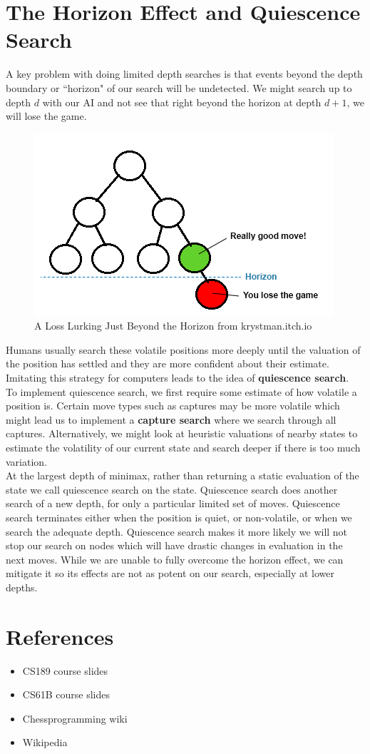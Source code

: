 \documentclass[12pt, letterpaper]{article}
\begin{document}
\section*{The Horizon Effect and Quiescence Search}
A key problem with doing limited depth searches is that events beyond the depth boundary or ``horizon" of our search will be undetected. We might search up to depth $d$ with our AI and not see that right beyond the horizon at depth $d + 1$, we will lose the game. \\
\begin{figure}[H]
    \centering
    \includegraphics[]{horizon.png}
    \caption*{A Loss Lurking Just Beyond the Horizon from krystman.itch.io}
\end{figure}
Humans usually search these volatile positions more deeply until the valuation of the position has settled and they are more confident about their estimate. Imitating this strategy for computers leads to the idea of \textbf{quiescence search}. \\
To implement quiescence search, we first require some estimate of how volatile a position is. Certain move types such as captures may be more volatile which might lead us to implement a \textbf{capture search} where we search through all captures. Alternatively, we might look at heuristic valuations of nearby states to estimate the volatility of our current state and search deeper if there is too much variation. \\
At the largest depth of minimax, rather than returning a static evaluation of the state we call quiescence search on the state. Quiescence search does another search of a new depth, for only a particular limited set of moves. Quiescence search terminates either when the position is quiet, or non-volatile, or when we search the adequate depth. Quiescence search makes it more likely we will not stop our search on nodes which will have drastic changes in evaluation in the next moves. While we are unable to fully overcome the horizon effect, we can mitigate it so its effects are not as potent on our search, especially at lower depths.
\section*{References}
\begin{itemize}
    \item CS189 course slides
    \item CS61B course slides
    \item Chessprogramming wiki
    \item Wikipedia
\end{itemize}
\end{document}
